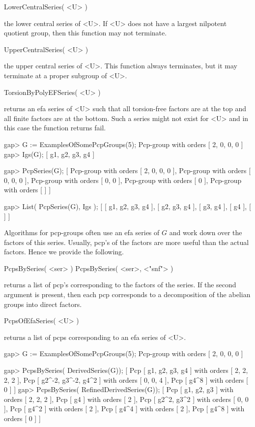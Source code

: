 \>LowerCentralSeries( <U> )

the lower  central  series of <U>.  If  <U>  does not   have a
largest  nilpotent quotient group, then  this function may not
terminate.

\> UpperCentralSeries( <U> )

the upper central series of <U>. This function always terminates,
but it may terminate at a proper subgroup of <U>. 

\>TorsionByPolyEFSeries( <U> )

returns  an  efa series  of   <U> such  that  all torsion-free
factors  are  at the  top and  all  finite  factors are at the
bottom. Such a series might not exist for <U> and in this case
the function returns fail.

\beginexample
gap> G := ExamplesOfSomePcpGroups(5);
Pcp-group with orders [ 2, 0, 0, 0 ]
gap> Igs(G);
[ g1, g2, g3, g4 ]

gap> PcpSeries(G);
[ Pcp-group with orders [ 2, 0, 0, 0 ],
  Pcp-group with orders [ 0, 0, 0 ],
  Pcp-group with orders [ 0, 0 ],
  Pcp-group with orders [ 0 ],
  Pcp-group with orders [  ] ]

gap> List( PcpSeries(G), Igs );
[ [ g1, g2, g3, g4 ], [ g2, g3, g4 ], [ g3, g4 ], [ g4 ], [  ] ]
\endexample

Algorithms for pcp-groups often use an efa series of $G$ and work down
over the factors of  this series. Usually,   pcp's of the factors  are
more useful than the actual factors. Hence we provide the following.

\>PcpsBySeries( <ser> )
\>PcpsBySeries( <ser>, <"snf"> )

returns  a  list of  pcp's corresponding  to  the factors of the
series.   If   the second argument  is  present,  then  each pcp
corresponds to a decomposition of  the abelian groups into direct
factors.

\>PcpsOfEfaSeries( <U> )

returns a list of pcps corresponding to an efa series of <U>.

\beginexample
gap> G := ExamplesOfSomePcpGroups(5);
Pcp-group with orders [ 2, 0, 0, 0 ]

gap> PcpsBySeries( DerivedSeries(G));
[ Pcp [ g1, g2, g3, g4 ] with orders [ 2, 2, 2, 2 ],
  Pcp [ g2^-2, g3^-2, g4^2 ] with orders [ 0, 0, 4 ],
  Pcp [ g4^8 ] with orders [ 0 ] ]
gap> PcpsBySeries( RefinedDerivedSeries(G));
[ Pcp [ g1, g2, g3 ] with orders [ 2, 2, 2 ],
  Pcp [ g4 ] with orders [ 2 ],
  Pcp [ g2^2, g3^2 ] with orders [ 0, 0 ],
  Pcp [ g4^2 ] with orders [ 2 ],
  Pcp [ g4^4 ] with orders [ 2 ],
  Pcp [ g4^8 ] with orders [ 0 ] ]

